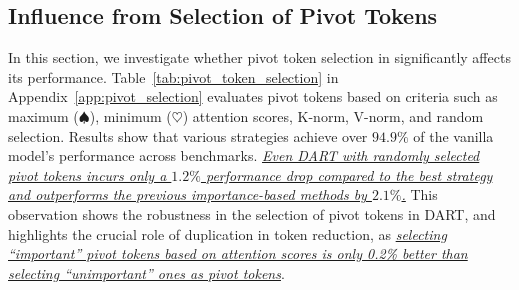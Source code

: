 \subsection{Influence from Selection of Pivot Tokens}\label{pivot_token_selection}
\vspace{-2mm}
% 
In this section, we investigate whether pivot token selection in \algname significantly affects its performance. 
Table~\ref{tab:pivot_token_selection} in Appendix~\ref{app:pivot_selection} evaluates pivot tokens based on criteria such as maximum ($\spadesuit$), minimum ($\heartsuit$) attention scores, K-norm, V-norm, and random selection.
Results show that various strategies achieve over $94.9\%$ of the vanilla model's performance across benchmarks. \ul{\emph{Even DART with randomly selected pivot tokens incurs only a $1.2\%$ performance drop compared to the best strategy and outperforms the previous importance-based methods by $2.1\%$.}}
This observation shows the robustness in the selection of pivot tokens in DART, and 
highlights the crucial role of duplication in token reduction, as \ul{\emph{selecting ``important'' pivot tokens based on attention scores is only 0.2\% better than selecting ``unimportant'' ones as pivot tokens}}.


